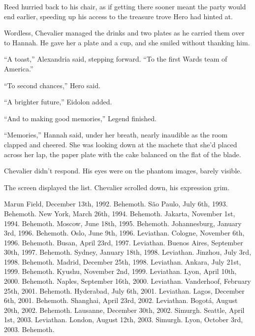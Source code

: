 Reed hurried back to his chair, as if getting there sooner meant the party would end earlier, speeding up his access to the treasure trove Hero had hinted at.



Wordless, Chevalier managed the drinks and two plates as he carried them over to Hannah.  He gave her a plate and a cup, and she smiled without thanking him.



``A toast,'' Alexandria said, stepping forward.  ``To the first Wards team of America.''



``To second chances,'' Hero said.



``A brighter future,'' Eidolon added.



``And to making good memories,'' Legend finished.



``Memories,'' Hannah said, under her breath, nearly inaudible as the room clapped and cheered.  She was looking down at the machete that she'd placed across her lap, the paper plate with the cake balanced on the flat of the blade.



Chevalier didn't respond.  His eyes were on the phantom images, barely visible.



\blacksquare



The screen displayed the list.  Chevalier scrolled down, his expression grim.



Marun Field, December 13th, 1992.  Behemoth.
S\~{a}o Paulo, July 6th, 1993.  Behemoth.
New York, March 26th, 1994.  Behemoth.
Jakarta, November 1st, 1994.  Behemoth.
Moscow, June 18th, 1995.  Behemoth.
Johannesburg, January 3rd, 1996.  Behemoth.
Oslo, June 9th, 1996.  Leviathan.
Cologne, November 6th, 1996.  Behemoth.
Busan, April 23rd, 1997.  Leviathan.
Buenos Aires, September 30th, 1997.  Behemoth.
Sydney, January 18th, 1998.  Leviathan.
Jinzhou, July 3rd, 1998.  Behemoth.
Madrid, December 25th, 1998.  Leviathan.
Ankara, July 21st, 1999.  Behemoth.
Kyushu, November 2nd, 1999.  Leviathan.
Lyon, April 10th, 2000.  Behemoth.
Naples, September 16th, 2000.  Leviathan.
Vanderhoof, February 25th, 2001.  Behemoth.
Hyderabad, July 6th, 2001.  Leviathan.
Lagos, December 6th, 2001.  Behemoth.
Shanghai, April 23rd, 2002.  Leviathan.
Bogot\'{a}, August 20th, 2002.  Behemoth.
Lausanne, December 30th, 2002.  Simurgh.
Seattle, April 1st, 2003.  Leviathan.
London, August 12th, 2003.  Simurgh.
Lyon, October 3rd, 2003.  Behemoth.



